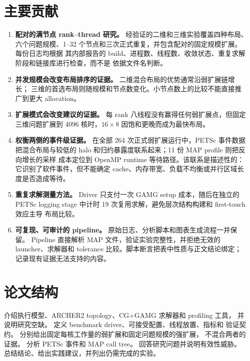 \documentclass[11pt,a4paper,oneside]{report}
\begin{document}
\section{主要贡献}
\label{sec:contributions}
\begin{enumerate}
  \item \textbf{配对的满节点 rank--thread 研究。} 经验证的二维和三维实验覆盖四种布局、
    六个问题规模、1--32 个节点和三次正式重复，并包含配对的固定规模扩展。每份日志均根据
    其内部报告的 build、进程数、线程数、收敛状态、重复求解阶段和链接库进行检查，而不是
    依据文件名判断。

  \item \textbf{并发规模会改变布局排序的证据。} 二维混合布局的优势通常沿弱扩展链增长；
    三维的首选布局则随规模和节点数变化。小节点数上的比较不能直接推广到更大 allocation。

  \item \textbf{扩展模式会改变建议的证据。} 每 rank 八线程没有赢得任何弱扩展点，但固定
    三维问题扩展到 4096 核时，$16\times8$ 因饱和更晚而成为最快布局。

  \item \textbf{权衡两侧的事件级证据。} 在全部 264 次正式弱扩展运行中，PETSc 事件数据
    把混合布局与较低的 halo 和归约暴露度联系起来；11 份 MAP profile 则把反向增长的采样
    成本定位到 OpenMP runtime 等待路径。该联系是描述性的：它识别了软件事件，但不能确定
    cache、内存带宽、负载不均衡或并行区域长度是否造成等待。

  \item \textbf{重复求解测量方法。} Driver 只支付一次 GAMG setup 成本，随后在独立的
    PETSc logging stage 中计时 19 次复用求解，避免层次结构构建和 first-touch 效应主导
    布局比较。

  \item \textbf{可复现、可审计的 pipeline。} 原始日志、分析脚本和图表生成流程一并保留。
    Pipeline 直接解析 MAP 文件，验证实验完整性，并拒绝无效的 launcher、求解器和 tolerance
    比较。脚本断言把表中性质与正文结论绑定； 记录现有证据无法支持的内容。
\end{enumerate}

\section{论文结构}
\label{sec:structure}
 介绍执行模型、ARCHER2 topology、CG+GAMG 求解器和 profiling 工具，
并说明研究空缺。 定义 benchmark driver、可接受配置、线程放置、指标和
验证契约。 分别给出固定每核工作量的弱扩展和固定问题规模的强扩展，
不混合两者的证据。 分析 PETSc 事件和 MAP call tree。
 回答研究问题并说明有效性威胁。
总结结论、给出实践建议，并列出仍需完成的实验。
\end{document}
